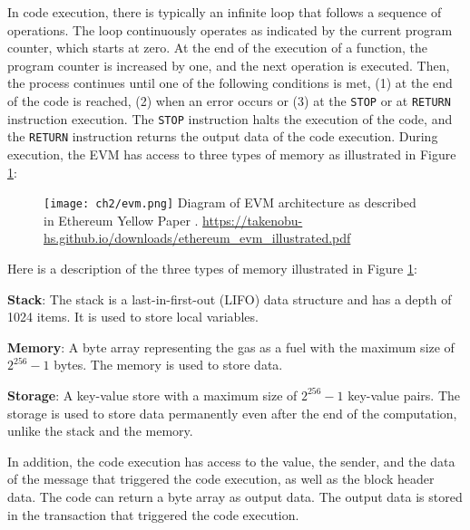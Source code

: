 In code execution, there is typically an infinite loop that follows a sequence of operations. The loop continuously operates as indicated
by the current program counter, which starts at zero. At the end of the execution of a function, the program counter is increased by one, and the next
operation is executed. Then, the process continues until one of the following conditions is met, (1) at the end of the code is reached, (2) when an error occurs or
(3) at the \texttt{STOP} or at \texttt{RETURN} instruction execution. The \texttt{STOP} instruction halts the execution of the code, and the \texttt{RETURN} instruction
returns the output data of the code execution. During execution, the EVM has access to three types of memory as illustrated in Figure \ref{fig:evm}:

\begin{figure}[H]
    \centering
    \texttt{[image: ch2/evm.png]}
    {Diagram of EVM architecture as described in Ethereum Yellow Paper \cite{ethereum_yellow_paper}.
    }{\url{https://takenobu-hs.github.io/downloads/ethereum_evm_illustrated.pdf}}
    \label{fig:evm}
 \end{figure}

 Here is a description of the three types of memory illustrated in Figure \ref{fig:evm}:

\begin{list}{-}{}
   \item \textbf{Stack}: The stack is a last-in-first-out (LIFO) data structure and has a depth of 1024 items. It is used to store local variables.
   \item \textbf{Memory}: A byte array representing the gas as a fuel  with the maximum size of $2^{256} - 1$ bytes. The memory is used to store data.
   \item \textbf{Storage}: A key-value store with a maximum size of $2^{256} - 1$ key-value pairs. The storage is used to store data permanently even after the end
         of the computation, unlike the stack and the memory.
\end{list}


In addition, the code execution has access to the value, the sender, and the data of the message that triggered the code execution, as well as
the block header data. The code can return a byte array as output data. The output data is stored in the transaction that triggered the code execution.



